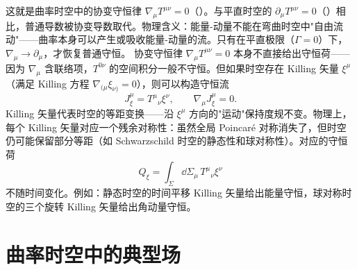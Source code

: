 这就是曲率时空中的协变守恒律 $\nabla_\mu T^{\mu\nu}=0$（）。与平直时空的 $\partial_\mu T^{\mu\nu}=0$（）相比，普通导数被协变导数取代。物理含义：能量-动量不能在弯曲时空中"自由流动"——曲率本身可以产生或吸收能量-动量的流。只有在平直极限（$\Gamma=0$）下，$\nabla_\mu\to\partial_\mu$，才恢复普通守恒。
协变守恒律 $\nabla_\mu T^{\mu\nu}=0$ 本身不直接给出守恒荷——因为 $\nabla_\mu$ 含联络项，$T^{0\nu}$ 的空间积分一般不守恒。但如果时空存在 Killing 矢量 $\xi^\mu$（满足 Killing 方程 $\nabla_{(\mu}\xi_{\nu)}=0$），则可以构造守恒流
\begin{equation*}\boxed{
J^\mu_\xi=T^\mu{}_\nu\xi^\nu,\qquad \nabla_\mu J^\mu_\xi=0.
}
\end{equation*}
Killing 矢量代表时空的等距变换——沿 $\xi^\mu$ 方向的"运动"保持度规不变。物理上，每个 Killing 矢量对应一个残余对称性：虽然全局 Poincaré 对称消失了，但时空仍可能保留部分等距（如 Schwarzschild 时空的静态性和球对称性）。对应的守恒荷
\begin{equation*}Q_\xi=\int_\Sigma \dd\Sigma_\mu\,T^\mu{}_\nu\xi^\nu
\end{equation*}
不随时间变化。例如：静态时空的时间平移 Killing 矢量给出能量守恒，球对称时空的三个旋转 Killing 矢量给出角动量守恒。



\section{曲率时空中的典型场}

